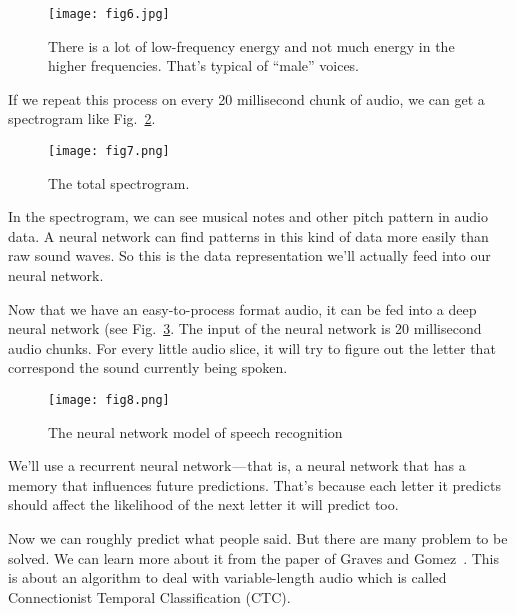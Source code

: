 \documentclass[10pt,twocolumn,letterpaper]{article}
\begin{document}
	\begin{figure}[h]
		\centering
		\texttt{[image: fig6.jpg]}
		\caption{There is a lot of low-frequency energy and not much energy in the higher frequencies. That’s typical of “male” voices.} \label{fig6}
	\end{figure}
	\par
	If we repeat this process on every 20 millisecond chunk of audio, we can get a spectrogram like Fig.~\ref{fig7}.
	\begin{figure}[h]
		\centering
		\texttt{[image: fig7.png]}
		\caption{The total spectrogram.} \label{fig7}
	\end{figure}
	\par
	In the spectrogram, we can see musical notes and other pitch pattern in audio data. A neural network can find patterns in this kind of data more easily than raw sound waves. So this is the data representation we’ll actually feed into our neural network.
	\par
	Now that we have an easy-to-process format audio, it can be fed into a deep neural network (see Fig.~\ref{fig8}. The input of the neural network is 20 millisecond audio chunks. For every little audio slice, it will try to figure out the letter that correspond the sound currently being spoken.
	\begin{figure}[h]
		\centering
		\texttt{[image: fig8.png]}
		\caption{The neural network model of speech recognition} \label{fig8}
	\end{figure}
	We’ll use a recurrent neural network — that is, a neural network that has a memory that influences future predictions. That’s because each letter it predicts should affect the likelihood of the next letter it will predict too. 
	\par
	Now we can roughly predict what people said. But there are many problem to be solved. We can learn more about it from the paper of Graves and Gomez~\cite{Graves}. This is about an algorithm to deal with variable-length audio which is called Connectionist Temporal Classification (CTC). 
	{\small
		
		
	}
\end{document}
